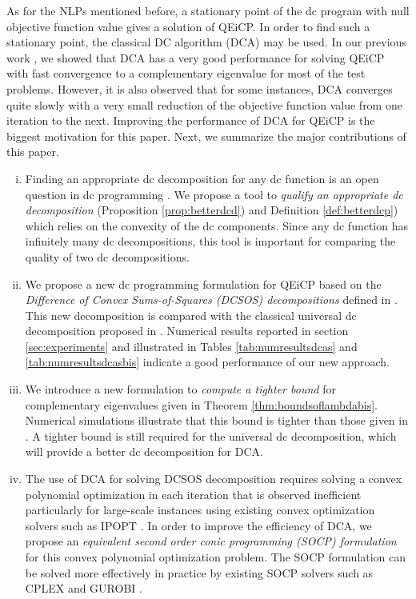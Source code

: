 \documentclass[3p]{elsarticle}
\begin{document}
As for the NLPs mentioned before, a stationary point of the dc program with null objective function value gives a solution of QEiCP. In order to find such a stationary point, the classical DC algorithm (DCA) \cite{Pham98,Pham18} may be used. In our previous work \cite{Niu15}, we showed that DCA has a very good performance for solving QEiCP with fast convergence to a complementary eigenvalue for most of the test problems. However, it is also observed that for some instances, DCA converges quite slowly with a very small reduction of the objective function value from one iteration to the next. Improving the performance of DCA for QEiCP is the biggest motivation for this paper. Next, we summarize the major contributions of this paper.
\begin{enumerate}[(i)]
	\item Finding an appropriate dc decomposition for any dc function is an open question in dc programming \cite{Pham18}. We propose a tool to \emph{qualify an appropriate dc decomposition} (Proposition \ref{prop:betterdcd}) and Definition \ref{def:betterdcp}) which relies on the convexity of the dc components. Since any dc function has infinitely many dc decompositions, this tool is important for comparing the quality of two dc decompositions.   
	\item We propose a new dc programming formulation for QEiCP based on the \emph{Difference of Convex Sums-of-Squares (DCSOS) decompositions} defined in \cite{Niu17}. This new decomposition is compared with the classical universal dc decomposition proposed in \cite{Niu15}. Numerical results reported in section \ref{sec:experiments} and illustrated in Tables \ref{tab:numresultsdcas} and \ref{tab:numresultsdcasbis} indicate a good performance of our new approach.  
	\item We introduce a new formulation to \emph{compute a tighter bound} for complementary eigenvalues given in Theorem \ref{thm:boundsoflambdabis}. Numerical simulations illustrate that this bound is tighter than those given in \cite{Fernandes14,Niu15}. A tighter bound is still required for the universal dc decomposition, which will provide a better dc decomposition for DCA.
	\item The use of DCA for solving DCSOS decomposition requires solving a convex polynomial optimization in each iteration that is observed inefficient particularly for large-scale instances using existing convex optimization solvers such as IPOPT \cite{Ipopt}. In order to improve the efficiency of DCA, we propose an \emph{equivalent second order conic programming (SOCP) formulation} for this convex polynomial optimization problem. The SOCP formulation can be solved more effectively in practice by existing SOCP solvers such as CPLEX \cite{Cplex} and GUROBI \cite{Gurobi}.  

\end{enumerate}
\end{document}
